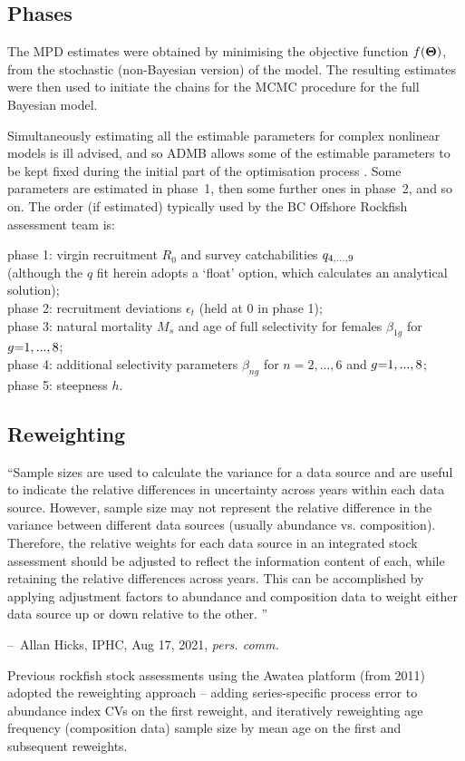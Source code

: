 \documentclass[11pt]{book}
\makeatletter
\def\bfTh{{\bf \Theta}}%
\newenvironment{chapquote}[2][2em]
  {\setlength{\@tempdima}{#1}%
   \def\chapquote@author{#2}%
   \parshape 1 \@tempdima \dimexpr\textwidth-2\@tempdima\relax%
   \small\color{colquote}}
  {\par\normalfont\hfill--\ \chapquote@author\hspace*{\@tempdima}\par\smallskip}
\def\bfTh{{\bf \Theta}}%
\def\hsd{\hspace*{1ex}}
\makeatother
\begin{document}
\subsection{Phases}

The MPD estimates were obtained by minimising the objective function $f(\bfTh)$, from the stochastic (non-Bayesian version) of the model. 
The resulting estimates were then used to initiate the chains for the MCMC procedure for the full Bayesian model.

Simultaneously estimating all the estimable parameters for complex nonlinear models is ill advised, and so ADMB allows some of the estimable parameters to be kept fixed during the initial part of the optimisation process \citet{ADMB:2009}. 
Some parameters are estimated in phase~1, then some further ones in phase~2, and so on. 
The order (if estimated) typically used by the BC Offshore Rockfish assessment team is:

\begin{changemargin}{0.25in}{0.25in}{0.5ex}
phase 1: virgin recruitment $R_0$ and survey catchabilities $q_{4,...,9}$\\
  \hsd (although the $q$ fit herein adopts a `float' option, which calculates an analytical solution);\\
phase 2: recruitment deviations $\epsilon_t$ (held at 0 in phase 1);\\
phase 3: natural mortality $M_{s}$ and age of full selectivity for females $\beta_{1g}$ for $g{=}1,...,8$;\\
phase 4: additional selectivity parameters $\beta_{ng}$ for $n{=}2,...,6$ and $g{=}1,...,8$;\\
phase 5: steepness $h$.
\end{changemargin}

\subsection{Reweighting} \label{ss:reweight}

\begin{chapquote}{Allan Hicks, IPHC, Aug 17, 2021, \textit{pers. comm.}}
``Sample sizes are used to calculate the variance for a data source and are useful to indicate the relative differences in uncertainty across years within each data source.
However, sample size may not represent the relative difference in the variance between different data sources (usually abundance vs. composition).
Therefore, the relative weights for each data source in an integrated stock assessment should be adjusted to reflect the information content of each, while retaining the relative differences across years.
This can be accomplished by applying adjustment factors to abundance and composition data to weight either data source up or down relative to the other.
''
\end{chapquote}
Previous rockfish stock assessments using the Awatea platform (from 2011) adopted the \citet{Francis:2011} reweighting approach -- adding series-specific process error to abundance index CVs on the first reweight, and iteratively reweighting age frequency (composition data) sample size by mean age on the first and subsequent reweights.
\end{document}
